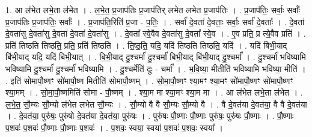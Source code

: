 \documentclass[17pt]{extarticle}
\begin{document}
1. आ ल॑भेत लभे॒ता ल॑भेत । . ल॒भे॒त॒ प्र॒जाप॑तिः प्र॒जाप॑तिर् लभेत लभेत प्र॒जाप॑तिः । . प्र॒जाप॑तिः॒ सर्वाः॒ सर्वाः᳚ प्र॒जाप॑तिः प्र॒जाप॑तिः॒ सर्वाः᳚ । . प्र॒जाप॑ति॒रिति॑ प्र॒जा - प॒तिः॒ । . सर्वा॑ दे॒वता॑ दे॒वताः॒ सर्वाः॒ सर्वा॑ दे॒वताः᳚ । . दे॒वता॑ दे॒वता॑सु दे॒वता॑सु दे॒वता॑ दे॒वता॑ दे॒वता॑सु । . दे॒वता᳚ स्वे॒वैव दे॒वता॑सु दे॒वता᳚ स्वे॒व । . ए॒व प्रति॒ प्र त्ये॒वैव प्रति॑ । . प्रति॑ तिष्ठति तिष्ठति॒ प्रति॒ प्रति॑ तिष्ठति । . ति॒ष्ठ॒ति॒ यदि॒ यदि॑ तिष्ठति तिष्ठति॒ यदि॑ । . यदि॑ बिभी॒याद् बि॑भी॒याद् यदि॒ यदि॑ बिभी॒यात् । . बि॒भी॒याद् दु॒श्चर्मा॑ दु॒श्चर्मा॑ बिभी॒याद् बि॑भी॒याद् दु॒श्चर्मा᳚ । . दु॒श्चर्मा॑ भविष्यामि भविष्यामि दु॒श्चर्मा॑ दु॒श्चर्मा॑ भविष्यामि । . दु॒श्चर्मेति॑ दुः - चर्मा᳚ । . भ॒वि॒ष्या॒ मीतीति॑ भविष्यामि भविष्या॒ मीति॑ । . इति॑ सोमापौ॒ष्णꣳ सो॑मापौ॒ष्ण मितीति॑ सोमापौ॒ष्णम् । . सो॒मा॒पौ॒ष्णꣳ श्या॒मꣳ श्या॒मꣳ सो॑मापौ॒ष्णꣳ सो॑मापौ॒ष्णꣳ श्या॒मम् । . सो॒मा॒पौ॒ष्णमिति॑ सोमा - पौ॒ष्णम् । . श्या॒म मा श्या॒मꣳ श्या॒म मा । . आ ल॑भेत लभे॒ता ल॑भेत । . ल॒भे॒त॒ सौ॒म्यः सौ॒म्यो ल॑भेत लभेत सौ॒म्यः । . सौ॒म्यो वै वै सौ॒म्यः सौ॒म्यो वै । . वै दे॒वत॑या दे॒वत॑या॒ वै वै दे॒वत॑या । . दे॒वत॑या॒ पुरु॑षः॒ पुरु॑षो दे॒वत॑या दे॒वत॑या॒ पुरु॑षः । . पुरु॑षः पौ॒ष्णाः पौ॒ष्णाः पुरु॑षः॒ पुरु॑षः पौ॒ष्णाः । . पौ॒ष्णाः प॒शवः॑ प॒शवः॑ पौ॒ष्णाः पौ॒ष्णाः प॒शवः॑ । . प॒शवः॒ स्वया॒ स्वया॑ प॒शवः॑ प॒शवः॒ स्वया᳚ । \newline
\end{document}
